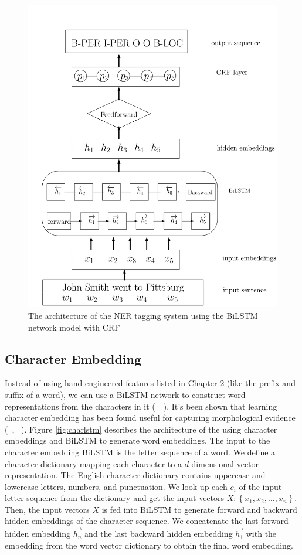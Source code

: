 \documentclass{sfuthesis}
\begin{document}
\begin{figure}
  \centering
  \includegraphics[scale=0.6]{bilstmcrf.pdf}
 \caption{The architecture of the NER tagging system using the BiLSTM network model with CRF}
  \label{fig:bilstmcrf}
\end{figure}

\subsection{Character Embedding}

Instead of using hand-engineered features listed in Chapter 2 (like the prefix and suffix of a word), we can use a BiLSTM network to construct word representations from the characters in it (~\citeauthor{lample2016neural}~\citeyear{lample2016neural}). It's been shown that learning character embedding has been found useful for capturing morphological evidence (~\citeauthor{ling2015finding}, ~\citeyear{ling2015finding}). Figure \ref{fig:charlstm} describes the architecture of the using character embeddings and BiLSTM to generate word embeddings. The input to the character embedding BiLSTM is the letter sequence of a word. We define a character dictionary mapping each character to a $d$-dimensional vector representation. The English character dictionary contains uppercase and lowercase letters, numbers, and punctuation. We look up each $c_{i}$ of the input letter sequence from the dictionary and get the input vectors $X:\left\{x_{1},x_{2},\dots,x_{n}\right\}$. Then, the input vectors $X$ is fed into BiLSTM to generate forward and backward hidden embeddings of the character sequence. We concatenate the last forward hidden embedding $\overrightarrow {h_{n}}$ and the last backward hidden embedding $\overrightarrow {h_{1}}$ with the embedding from the word vector dictionary to obtain the final word embedding.
\end{document}
